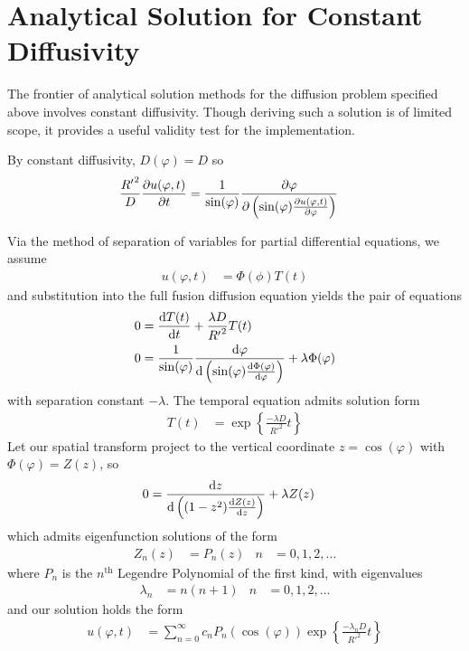 \documentclass{report}
\newcommand\Par[1]{{ \left({#1}\right) }}
\newcommand\Brace[1]{{ \left\{{#1}\right\} }}
\newcommand\R{{ R' }}
\begin{document}
\section{Analytical Solution for Constant Diffusivity}
The frontier of analytical solution methods for the diffusion problem specified above involves constant diffusivity. Though deriving such a solution is of limited scope, it provides a useful validity test for the implementation.

By constant diffusivity, $D(\varphi) = D$ so
\begin{align*}
	\frac{\R^2}{D} \pdv{u(\varphi, t)}{t} &= \frac{1}{\sin(\varphi)}\pdv\varphi\Par{\sin(\varphi) \pdv{u(\varphi, t)}{\varphi}}
\end{align*}

Via the method of separation of variables for partial differential equations, we assume
\begin{align*}
	u(\varphi, t) &= \Phi(\phi) T(t)
\end{align*}
and substitution into the full fusion diffusion equation yields the pair of equations
\begin{align*}
	0 &= \dv{T(t)}{t} + \frac{\lambda D}{\R^2} T(t) \\
	0 &= \frac{1}{\sin(\varphi)} \dv{\varphi}\Par{\sin(\varphi) \dv{\Phi(\varphi)}{\varphi}} + \lambda \Phi(\varphi)
\end{align*}
with separation constant $-\lambda$. The temporal equation admits solution form
\begin{align*}
	T(t) &= \exp\Brace{\frac{-\lambda D}{\R^2} t}
\end{align*}
Let our spatial transform project to the vertical coordinate $z = \cos(\varphi)$ with $\Phi(\varphi) = Z(z)$, so
\begin{align*}
	0 &= \dv{z}\Par{\Par{1 - z^2} \dv{Z(z)}{z}} + \lambda Z(z)
\end{align*}
which admits eigenfunction solutions of the form
\begin{align*}
	Z_n(z) &= P_n(z) & n &= 0, 1, 2, ...
\end{align*}
where $P_n$ is the $n^\text{th}$ Legendre Polynomial of the first kind, with eigenvalues
\begin{align*}
	\lambda_n &= n \Par{n + 1} & n &= 0, 1, 2, ...
\end{align*}
and our solution holds the form
\begin{align*}
	u(\varphi, t) &= \sum_{n = 0}^\infty c_n P_n\Par{\cos(\varphi)} \exp\Brace{\frac{-\lambda_n D}{\R^2} t}
\end{align*}
\end{document}
